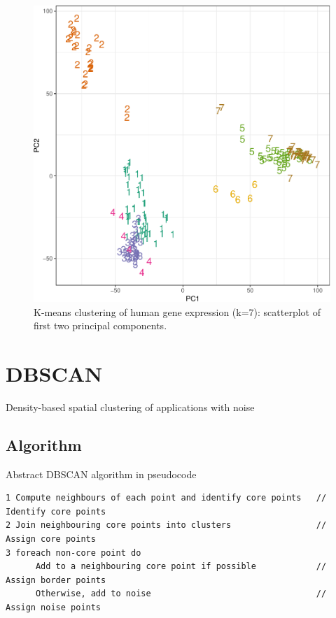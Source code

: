 \documentclass[]{book}
\theoremstyle{definition}
\theoremstyle{definition}
\theoremstyle{definition}
\theoremstyle{remark}
\begin{document}
\begin{figure}

{\centering \includegraphics[width=0.5\linewidth]{09-clustering_files/figure-latex/tissueExpressionPCA-1} 

}

\caption{K-means clustering of human gene expression (k=7): scatterplot of first two principal components.}\label{fig:tissueExpressionPCA}
\end{figure}

\section{DBSCAN}\label{dbscan}

Density-based spatial clustering of applications with noise

\subsection{Algorithm}\label{algorithm-1}

Abstract DBSCAN algorithm in pseudocode \citep{Schubert2017}

\begin{verbatim}
1 Compute neighbours of each point and identify core points   // Identify core points
2 Join neighbouring core points into clusters                 // Assign core points
3 foreach non-core point do
      Add to a neighbouring core point if possible            // Assign border points
      Otherwise, add to noise                                 // Assign noise points
\end{verbatim}
\end{document}
